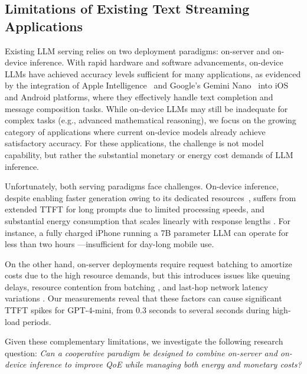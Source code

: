 \subsection{Limitations of Existing Text Streaming Applications}
\label{sec:existing_limitations}
Existing LLM serving relies on two deployment paradigms: on-server and on-device inference. With rapid hardware and software advancements, on-device LLMs have achieved accuracy levels sufficient for many applications, as evidenced by the integration of Apple Intelligence~\citep{appleintelligence} and Google's Gemini Nano~\cite{gemini_nano} into iOS and Android platforms, where they effectively handle text completion and message composition tasks. While on-device LLMs may still be inadequate for complex tasks (e.g., advanced mathematical reasoning), we focus on the growing category of applications where current on-device models already achieve satisfactory accuracy. For these applications, the challenge is not model capability, but rather the substantial monetary or energy cost demands of LLM inference.

Unfortunately, both serving paradigms face challenges. On-device inference, despite enabling faster generation owing to its dedicated resources~\citep{powerinfer,powerinfer2}, suffers from extended TTFT for long prompts due to limited processing speeds, and substantial energy consumption that scales linearly with response lengths \citep{edgebenchmark}. For instance, a fully charged iPhone running a 7B parameter LLM can operate for less than two hours \citep{liu2024mobilellm}---insufficient for day-long mobile use.

On the other hand, on-server deployments require request batching to amortize costs due to the high resource demands, but this introduces issues like queuing delays, resource contention from batching \citep{orca,vllm,sarathi}, and last-hop network latency variations \cite{eloquent}. Our measurements reveal that these factors can cause significant TTFT spikes for GPT-4-mini, from 0.3 seconds to several seconds during high-load periods.

Given these complementary limitations, we investigate the following research question: \emph{Can a cooperative paradigm be designed to combine on-server and on-device inference to improve QoE while managing both energy and monetary costs?} 
